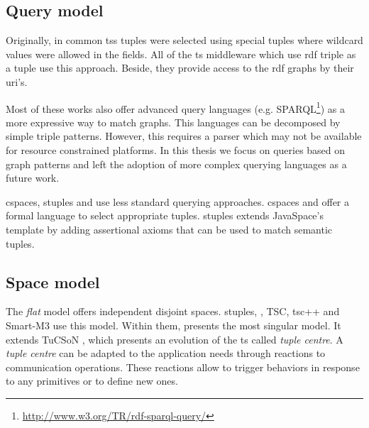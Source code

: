 


\subsection{Query model}

Originally, in common \ac{ts}s tuples were selected using special tuples where wildcard values were allowed in the fields.
All of the \ac{ts} middleware which use \ac{rdf} triple as a tuple use this approach.
Beside, they provide access to the \ac{rdf} graphs by their \ac{uri}'s.

Most of these works also offer advanced query languages (e.g. SPARQL\footnote{\url{http://www.w3.org/TR/rdf-sparql-query/}}) as a more expressive way to match graphs.
This languages can be decomposed by simple triple patterns.
However, this requires a parser which may not be available for resource constrained platforms.
In this thesis we focus on queries based on graph patterns and left the adoption of more complex querying languages as a future work.

\ac{cspaces}, \ac{stuples} and \citeauthor{nardini_semantic_2013} use less standard querying approaches.
\ac{cspaces} \citep{martinrecuerda_towards_2005} and \citet{nardini_semantic_2013} offer a formal language to select appropriate tuples.
\ac{stuples}\citep{khushraj_stuples:_2004} extends JavaSpace's template by adding assertional axioms that can be used to match semantic tuples.




\subsection{Space model}

The \emph{flat} model offers independent disjoint spaces.
\ac{stuples}, \citet{nardini_semantic_2013}, TSC, tsc++ and Smart-M3 use this model.
Within them, \citet{nardini_semantic_2013} presents the most singular model.
It extends TuCSoN \cite{omicini_tucson:_1998}, which presents an evolution of the \ac{ts} called \emph{tuple centre}.
A \emph{tuple centre} can be adapted to the application needs through reactions to communication operations.
These reactions allow to trigger behaviors in response to any primitives or to define new ones.


